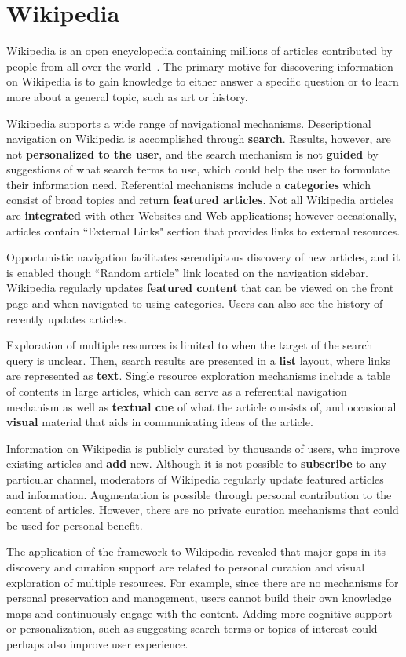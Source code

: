 {\section{Wikipedia}
Wikipedia is an open encyclopedia containing millions of articles contributed by people from all over the world~\cite{kittur2007power,volkel2006semantic}. The primary motive for discovering information on Wikipedia is to gain knowledge to either answer a specific question or to learn more about a general topic, such as art or history.

Wikipedia supports a wide range of navigational mechanisms. Descriptional navigation on Wikipedia is accomplished through \textbf{search}. Results, however, are not \textbf{personalized to the user}, and the search mechanism is not \textbf{guided} by suggestions of what search terms to use, which could help the user to formulate their information need. Referential mechanisms include a \textbf{categories} which consist of broad topics and return \textbf{featured articles}. Not all Wikipedia articles are \textbf{integrated} with other Websites and Web applications; however occasionally, articles contain ``External Links" section that provides links to external resources. 

Opportunistic navigation facilitates serendipitous discovery of new articles, and it is enabled though ``Random article'' link located on the navigation sidebar. Wikipedia regularly updates \textbf{featured content} that can be viewed on the front page and when navigated to using categories. Users can also see the history of recently updates articles. 

Exploration of multiple resources is limited to when the target of the search query is unclear. Then, search results are presented in a \textbf{list} layout, where links are represented as \textbf{text}. Single resource exploration mechanisms include a table of contents in large articles, which can serve as a referential navigation mechanism as well as \textbf{textual cue} of what the article consists of, and occasional \textbf{visual} material that aids in communicating ideas of the article.  

Information on Wikipedia is publicly curated by thousands of users, who improve existing articles and \textbf{add} new. Although it is not possible to \textbf{subscribe} to any particular channel, moderators of Wikipedia regularly update featured articles and information. Augmentation is possible through personal contribution to the content of articles. However, there are no private curation mechanisms that could be used for personal benefit. 

The application of the framework to Wikipedia revealed that major gaps in its discovery and curation support are related to personal curation and visual exploration of multiple resources. For example, since there are no mechanisms for personal preservation and management, users cannot build their own knowledge maps and continuously engage with the content. Adding more cognitive support or personalization, such as suggesting search terms or topics of interest could perhaps also improve user experience.

} %


